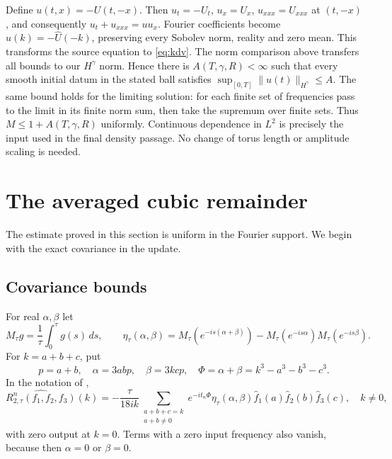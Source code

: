 \documentclass[11pt]{article}
\theoremstyle{remark}\newtheorem{remark}[theorem]{Remark}
\begin{document}
Define $u(t,x)=-U(t,-x)$. Then
$u_t=-U_t$, $u_x=U_x$, $u_{xxx}=U_{xxx}$ at $(t,-x)$, and consequently
$u_t+u_{xxx}=uu_x$. Fourier coefficients become
$\widehat u(k)=-\widehat U(-k)$, preserving every Sobolev norm, reality
and zero mean. This transforms the source equation to \eqref{eq:kdv}.
The norm comparison above transfers all bounds to our $H^\gamma$ norm.
Hence there is $A(T,\gamma,R)<\infty$ such that every smooth
initial datum in the stated ball satisfies
$\sup_{[0,T]}\|u(t)\|_{H^\gamma}\leq A$.
The same bound holds for the limiting solution: for each finite set of
frequencies pass to the limit in its finite norm sum, then take the supremum
over finite sets. Thus $M\leq1+A(T,\gamma,R)$ uniformly. Continuous
dependence in $L^2$ is precisely the input used in the final density passage.
No change of torus length or amplitude scaling is needed.

\section{The averaged cubic remainder}\label{sec:remainder}
The estimate proved in this section is uniform in the Fourier support.
We begin with the exact covariance in the update.
\subsection{Covariance bounds}
For real $\alpha,\beta$ let
\[
M_\tau g=\frac1\tau\int_0^\tau g(s)\,ds,\qquad
\eta_\tau(\alpha,\beta)=M_\tau(e^{-is(\alpha+\beta)})
-M_\tau(e^{-is\alpha})M_\tau(e^{-is\beta}).
\]
For $k=a+b+c$, put
\begin{equation}\label{eq:phases}
p=a+b,\quad \alpha=3abp,\quad \beta=3kcp,\quad
\Phi=\alpha+\beta=k^3-a^3-b^3-c^3.
\end{equation}
In the notation of \cite[Eqs.~(4.15),(6.1)]{LW},
\begin{equation}\label{eq:R2}
\widehat{R_{2,\tau}^{n}(f_1,f_2,f_3)}(k)
=-\frac{\tau}{18ik}\sum_{\substack{a+b+c=k\\a+b\ne0}}
e^{-it_n\Phi}\eta_\tau(\alpha,\beta)
\widehat f_1(a)\widehat f_2(b)\widehat f_3(c),\quad k\ne0,
\end{equation}
with zero output at $k=0$. Terms with a zero input frequency also vanish,
because then $\alpha=0$ or $\beta=0$.
\end{document}
